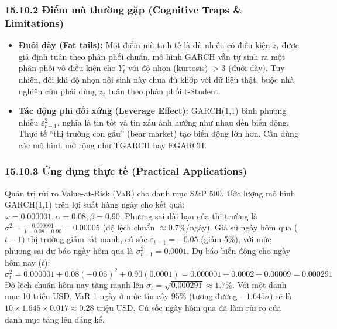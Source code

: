 \documentclass[
]{article}
\providecommand{\tightlist}{%
  \setlength{\itemsep}{0pt}\setlength{\parskip}{0pt}}
\begin{document}
\subsubsection{15.10.2 Điểm mù thường gặp (Cognitive Traps \&
Limitations)}\label{ux111iux1ec3m-muxf9-thux1b0ux1eddng-gux1eb7p-cognitive-traps-limitations-110}

\begin{itemize}
\tightlist
\item
  \textbf{Đuôi dày (Fat tails):} Một điểm mù tinh tế là dù nhiễu có điều
  kiện \(z_t\) được giả định tuân theo phân phối chuẩn, mô hình GARCH
  vẫn tự sinh ra một phân phối vô điều kiện cho \(Y_t\) với độ nhọn
  (kurtosis) \(> 3\) (đuôi dày). Tuy nhiên, đôi khi độ nhọn nội sinh này
  chưa đủ khớp với dữ liệu thật, buộc nhà nghiên cứu phải dùng \(z_t\)
  tuân theo phân phối t-Student.
\item
  \textbf{Tác động phi đối xứng (Leverage Effect):} GARCH(1,1) bình
  phương nhiễu \(\varepsilon_{t-1}^2\), nghĩa là tin tốt và tin xấu ảnh
  hưởng như nhau đến biến động. Thực tế ``thị trường con gấu'' (bear
  market) tạo biến động lớn hơn. Cần dùng các mô hình mở rộng như TGARCH
  hay EGARCH.
\end{itemize}

\subsubsection{15.10.3 Ứng dụng thực tế (Practical
Applications)}\label{ux1ee9ng-dux1ee5ng-thux1ef1c-tux1ebf-practical-applications-66}

Quản trị rủi ro Value-at-Risk (VaR) cho danh mục S\&P 500. Ước lượng mô
hình GARCH(1,1) trên lợi suất hàng ngày cho kết quả:
\(\omega = 0.000001, \alpha = 0.08, \beta = 0.90\). Phương sai dài hạn
của thị trường là
\(\bar{\sigma}^2 = \frac{0.000001}{1 - 0.08 - 0.90} = 0.00005\) (độ lệch
chuẩn \(\approx 0.7\%\)/ngày). Giả sử ngày hôm qua (\(t-1\)) thị trường
giảm rất mạnh, cú sốc \(\varepsilon_{t-1} = -0.05\) (giảm 5\%), với mức
phương sai dự báo ngày hôm qua là \(\sigma_{t-1}^2 = 0.0001\). Dự báo
biến động cho ngày hôm nay (\(t\)):
\[ \sigma_t^2 = 0.000001 + 0.08(-0.05)^2 + 0.90(0.0001) = 0.000001 + 0.0002 + 0.00009 = 0.000291 \]
Độ lệch chuẩn hôm nay tăng mạnh lên
\(\sigma_t = \sqrt{0.000291} \approx 1.7\%\). Với một danh mục 10 triệu
USD, VaR 1 ngày ở mức tin cậy 95\% (tương đương \(-1.645\sigma\)) sẽ là
\(10 \times 1.645 \times 0.017 \approx 0.28\) triệu USD. Cú sốc ngày hôm
qua đã làm rủi ro của danh mục tăng lên đáng kể.
\end{document}
